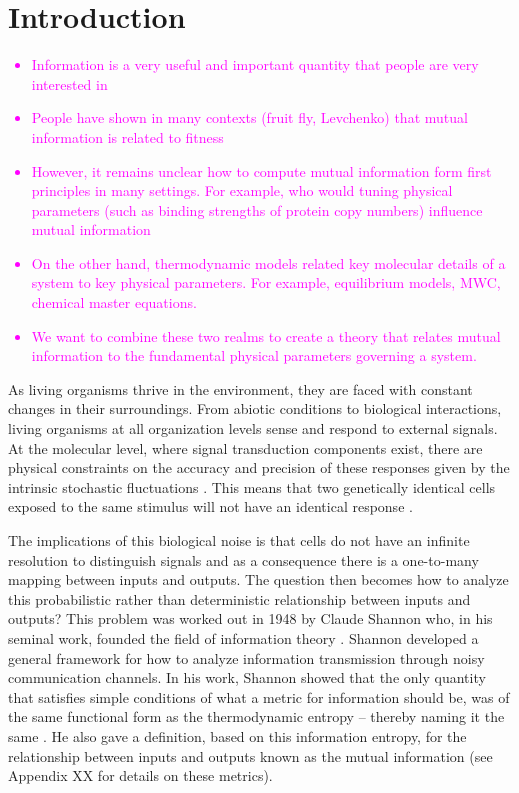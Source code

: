 \section{Introduction}

\textcolor{magenta}{
\begin{itemize}
	\item Information is a very useful and important quantity that people are very interested in
	\item People have shown in many contexts (fruit fly, Levchenko) that mutual information is related to fitness
	\item However, it remains unclear how to compute mutual information form first principles in many settings. For example, who would tuning physical parameters (such as binding strengths of protein copy numbers) influence mutual information
	\item On the other hand, thermodynamic models related key molecular details of a system to key physical parameters. For example, equilibrium models, MWC, chemical master equations.
	\item We want to combine these two realms to create a theory that relates mutual information to the fundamental physical parameters governing a system.
\end{itemize}
}

As living organisms thrive in the environment, they are faced with constant
changes in their surroundings. From abiotic conditions to biological
interactions, living organisms at all organization levels sense and respond to
external signals. At the molecular level, where signal transduction components
exist, there are physical constraints on the accuracy and precision of these
responses given by the intrinsic stochastic fluctuations  \cite{Nemenman2010}.
This means that two genetically identical cells exposed to the same stimulus
will not have an identical response \cite{Eldar2010}.

The implications of this biological noise is that cells do not have an infinite
resolution to distinguish signals and as a consequence there is a one-to-many
mapping between inputs and outputs. The question then becomes how to analyze
this probabilistic rather than deterministic relationship between inputs and
outputs? This problem was worked out in 1948 by Claude Shannon who, in his
seminal work, founded the field of information theory \cite{Shannon1948}.
Shannon developed a general framework for how to analyze information
transmission through noisy communication channels. In his work, Shannon showed
that the only quantity that satisfies simple conditions of what a metric for
information should be, was of the same functional form as the thermodynamic
entropy -- thereby naming it the same \cite{MacKay2003}. He also gave a
definition, based on this information entropy, for the relationship between
inputs and outputs known as the mutual information (see Appendix XX for details
on these metrics). 

